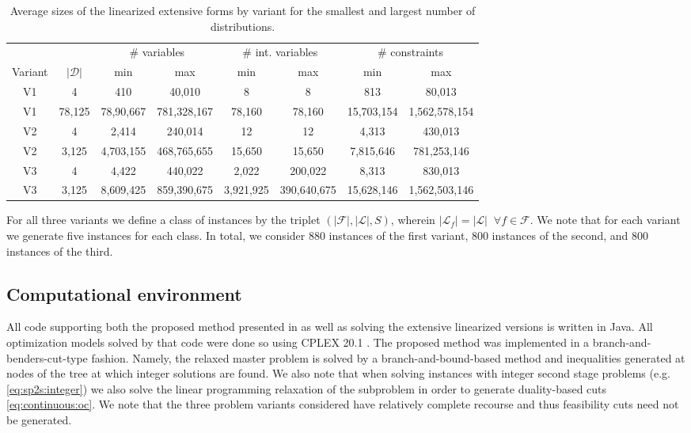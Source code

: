 \documentclass[12pt]{article}
\theoremstyle{thmstylethree}%
\newcommand{\mtc}[1] {\mathcal{#1}}
\begin{document}
\begin{table}\caption{Average sizes of the linearized extensive forms by variant for the smallest and largest number of distributions.}\label{tab:size}

    \centering
    \begin{tabular}{cccccccc}
    \toprule
             &  &\multicolumn{2}{c}{\# variables}  & \multicolumn{2}{c}{\# int. variables}   & \multicolumn{2}{c}{\# constraints}  \\
        Variant & $\vert\mtc{D}\vert$ & min & max & min & max & min & max \\
        \midrule
         V1& 4 &  410 &	40,010 &	8 &	8 &	813 	&80,013\\
         V1& 78,125 & 78,90,667 &	781,328,167 &	78,160 &	78,160 &	15,703,154 	&1,562,578,154 \\
         V2& 4 & 2,414 &	240,014 &	12 &	12 	&4,313 &	430,013\\
         V2& 3,125 & 4,703,155 &	468,765,655 &	15,650 &	15,650 &	7,815,646 	&781,253,146 \\
         V3& 4 & 4,422 &	440,022 &	2,022 &	200,022 &	8,313 &	830,013\\
         V3& 3,125& 8,609,425 &	859,390,675 &	3,921,925 	&390,640,675 &	15,628,146 &	1,562,503,146\\
         \bottomrule
    \end{tabular}
\end{table}



For all three variants we define a class of instances by the triplet $(\vert \mathcal{F} \vert, \vert \mathcal{L} \vert, S)$, wherein $\vert \mathcal{L}_{f} \vert = \vert \mathcal{L} \vert \;\; \forall f \in \mathcal{F}.$ We note that for each variant we generate five instances for each class. In total, we consider 880 instances of the first variant, 800 instances of the second, and 800 instances of the third. 




\subsection{Computational environment}
\label{subsec:comp_environment}
All code supporting both the proposed method presented in  as well as solving the extensive linearized versions is written in Java.
All optimization models solved by that code were done so using CPLEX 20.1 \cite{Cplex}.
The proposed method was implemented in a branch-and-benders-cut-type fashion. Namely, the relaxed master problem is solved by a branch-and-bound-based method and inequalities generated at nodes of the tree at which integer solutions are found.
We also note that when solving instances with integer second stage problems (e.g. \eqref{eq:sp2s:integer}) we also solve the linear programming relaxation of the subproblem in order to generate duality-based cuts \eqref{eq:continuous:oc}.  
We note that the three problem variants considered have relatively complete recourse and thus feasibility cuts need not be generated. 
\end{document}
